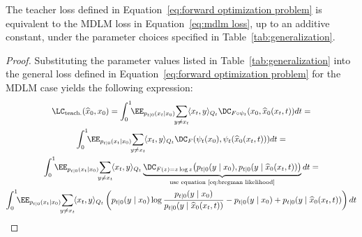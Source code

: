         \begin{proposition}
            The teacher loss defined in Equation~\eqref{eq:forward optimization problem} is equivalent to the MDLM loss in Equation~\eqref{eq:mdlm loss}, up to an additive constant, under the parameter choices specified in Table~\ref{tab:generalization}. 
        \end{proposition}
        \begin{proof}
            Substituting the parameter values listed in Table~\ref{tab:generalization} into the general loss defined in Equation~\eqref{eq:forward optimization problem} for the MDLM case yields the following expression:
            \begin{gather}
                \LC_{\text{teach.}}(\widehat{x}_0, x_0) = \int_0^1 \!\! \EE_{p_{t|0}(x_t|x_0)} \!\! \sum_{y \neq x_t}\!  \langle x_t, y\rangle_{Q_t} \DC_{F\circ\psi_t}\!\left(x_0, \widehat{x}_0(x_t, t)\right) \!dt = 
                \nonumber\\
                \int_0^1 \!\! \EE_{p_{t|0}(x_t|x_0)} \!\! \sum_{y \neq x_t}\!  \langle x_t, y\rangle_{Q_t} \DC_{F}\!\left(\psi_t(x_0), \psi_t(\widehat{x}_0(x_t, t)\right)) dt = 
                \nonumber\\
                \int_0^1 \!\! \EE_{p_{t|0}(x_t|x_0)} \!\! \sum_{y \neq x_t}\!  \langle x_t, y\rangle_{Q_t} \underbrace{\DC_{F(z) = z\log z}\!\left(p_{t\mid 0}(y\mid x_0), p_{t\mid 0}(y\mid \widehat{x}_0 (x_t, t))\right)}_{\text{use equation~\eqref{eq:bregman likelihood}}} dt = 
                \nonumber\\
                \int_0^1 \!\! \EE_{p_{t|0}(x_t|x_0)} \!\! \sum_{y \neq x_t}\!  \langle x_t, y\rangle_{Q_t} \left( p_{t\mid 0}(y\mid x_0) \log \frac{p_{t\mid 0}(y\mid x_0)}{p_{t\mid 0}(y\mid \widehat{x}_0 (x_t, t))} - p_{t\mid 0}(y\mid x_0) + p_{t\mid 0}(y\mid \widehat{x}_0 (x_t, t))\right) dt 
            \end{gather}
        \end{proof}